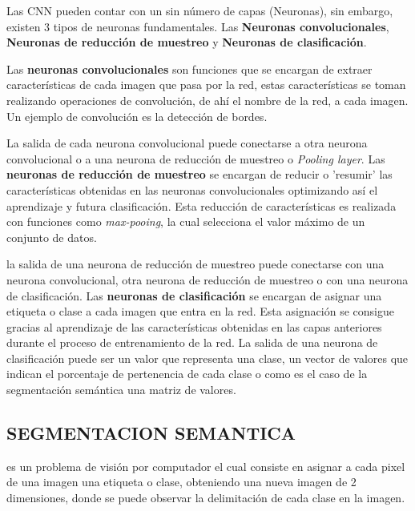 Las CNN pueden contar con un sin número de capas (Neuronas), sin embargo, existen 3 tipos de neuronas fundamentales. Las \textbf{Neuronas convolucionales}, \textbf{Neuronas de reducción de muestreo} y \textbf{Neuronas de clasificación}.   

Las \textbf{neuronas convolucionales}  son funciones que se encargan de extraer características de cada imagen que pasa por la red, estas características se toman realizando operaciones de convolución, de ahí el nombre de la red, a cada imagen. Un ejemplo de convolución es la detección de bordes.  


La salida de cada neurona convolucional puede conectarse a otra neurona convolucional o a una neurona de reducción de muestreo o \textit{Pooling layer}. Las \textbf{neuronas de reducción de muestreo} se encargan de reducir o 'resumir' las características obtenidas en las neuronas convolucionales optimizando así el aprendizaje y futura clasificación. Esta reducción de características es realizada con funciones como \textit{max-pooing}, la cual selecciona el valor máximo de un conjunto de datos. 


la salida de una neurona de reducción de muestreo puede conectarse con una neurona convolucional, otra neurona de reducción de muestreo o con una neurona de clasificación. Las \textbf{neuronas de clasificación} se encargan de asignar una etiqueta o clase a cada imagen que entra en la red. Esta asignación se consigue gracias al aprendizaje de las características obtenidas en las capas anteriores durante el proceso de entrenamiento de la red. La salida de una neurona de clasificación puede ser un valor que representa una clase, un vector de valores que indican el porcentaje de pertenencia de cada clase o como es el caso de la segmentación semántica una matriz de valores. 

\subsection{SEGMENTACION SEMANTICA} es un problema de visión por computador el cual consiste en asignar a cada pixel de una imagen una etiqueta o clase, obteniendo una nueva imagen de 2 dimensiones, donde se puede observar la delimitación de cada clase en la imagen. 

